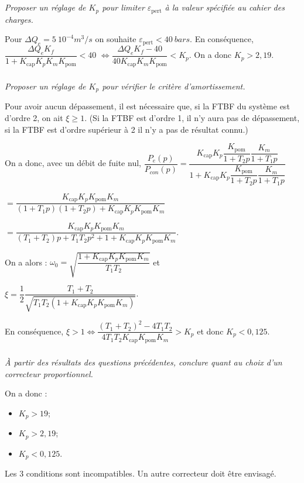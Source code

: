\documentclass[10pt,fleqn]{article} %
\begin{document}
\begin{multicols}{2}
\begin{corrige}
\end{corrige}
\else
\fi

\subparagraph{}
\textit{Proposer un réglage de $K_p$ pour limiter $\varepsilon_{\text{pert}}$ à la valeur spécifiée au cahier des charges.}
\ifprof
\begin{corrige}
Pour $\Delta Q_e = \SI{5}{10^{-4} m^3/s}$ on souhaite $\varepsilon_{\text{pert}} < \SI{40}{bars}$. En conséquence, 
$\dfrac{\Delta Q_e K_f}{1+K_{\text{cap}}K_pK_mK_{\text{pom}}} <40$ 
$\Leftrightarrow  \dfrac{\Delta Q_e K_f -40}{40K_{\text{cap}}K_mK_{\text{pom}}}<K_p$. On a donc $K_p>2,19$.
\end{corrige}
\else
\fi

\subparagraph{}
\textit{Proposer un réglage de $K_p$ pour vérifier le critère d’amortissement.}
\ifprof
\begin{corrige}
Pour avoir aucun dépassement, il est nécessaire que, si la FTBF du système est d'ordre 2, on ait $\xi\geq 1$. (Si la FTBF est d'ordre 1, il n'y aura pas de dépassement, si la FTBF est d'ordre supérieur à 2 il n'y a pas de résultat connu.)

On a donc, avec un débit de fuite nul, $\dfrac{P_e(p)}{P_{con}(p)}
=\dfrac{K_{\text{cap}}K_p\dfrac{K_{\text{pom}}}{1+T_2 p}\dfrac{K_{m}}{1+T_1 p}}{1+K_{\text{cap}}K_p\dfrac{K_{\text{pom}}}{1+T_2 p}\dfrac{K_{m}}{1+T_1 p}}$

$=\dfrac{K_{\text{cap}}K_pK_{\text{pom}} K_{m}}{\left(1+T_1 p\right)\left(1+T_2 p\right)+K_{\text{cap}}K_pK_{\text{pom}} K_{m}}$


$=\dfrac{
K_{\text{cap}}K_pK_{\text{pom}} K_{m}
}{
\left(T_1 +  T_2\right) p + T_1T_2 p^2+1+K_{\text{cap}}K_pK_{\text{pom}} K_{m}
}$.

On a alors : $\omega_0 = \sqrt{\dfrac{1+K_{\text{cap}}K_pK_{\text{pom}} K_{m}}{T_1T_2}}$
et

$\xi=\dfrac{1}{2}\dfrac{T_1+T_2}{\sqrt{T_1T_2 \left(1+K_{\text{cap}}K_pK_{\text{pom}} K_{m}\right)}}$.
 
En conséquence, $\xi>1\Leftrightarrow \dfrac{\left(T_1+T_2\right)^2-4T_1T_2 }{4T_1T_2 K_{\text{cap}}K_{\text{pom}} K_{m}} > K_p $ et donc $K_p<0,125 $.

\end{corrige}
\else
\fi


\subparagraph{}
\textit{À partir des résultats des questions précédentes, conclure quant au choix d’un correcteur proportionnel.}
\ifprof
\begin{corrige}
On a donc : 
\begin{itemize}
\item $K_p>19$;
\item $K_p> 2,19$;
\item $K_p<0,125 $.
\end{itemize}
Les 3 conditions sont incompatibles. Un autre correcteur doit être envisagé.
\end{corrige}


\end{multicols}
\end{document}
